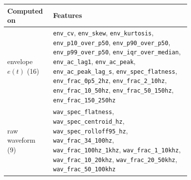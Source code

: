 \begin{tabular}{l>{\raggedright\arraybackslash}p{0.75\linewidth}}
\toprule
Computed on & Features \\
\midrule
envelope $e(t)$ (16) & \texttt{env\_cv}, \texttt{env\_skew}, \texttt{env\_kurtosis}, \texttt{env\_p10\_over\_p50}, \texttt{env\_p90\_over\_p50}, \texttt{env\_p99\_over\_p50}, \texttt{env\_iqr\_over\_median}, \texttt{env\_ac\_lag1}, \texttt{env\_ac\_peak}, \texttt{env\_ac\_peak\_lag\_s}, \texttt{env\_spec\_flatness}, \texttt{env\_frac\_0p5\_2hz}, \texttt{env\_frac\_2\_10hz}, \texttt{env\_frac\_10\_50hz}, \texttt{env\_frac\_50\_150hz}, \texttt{env\_frac\_150\_250hz} \\
raw waveform (9) & \texttt{wav\_spec\_flatness}, \texttt{wav\_spec\_centroid\_hz}, \texttt{wav\_spec\_rolloff95\_hz}, \texttt{wav\_frac\_34\_100hz}, \texttt{wav\_frac\_100hz\_1khz}, \texttt{wav\_frac\_1\_10khz}, \texttt{wav\_frac\_10\_20khz}, \texttt{wav\_frac\_20\_50khz}, \texttt{wav\_frac\_50\_100khz} \\
\bottomrule
\end{tabular}

